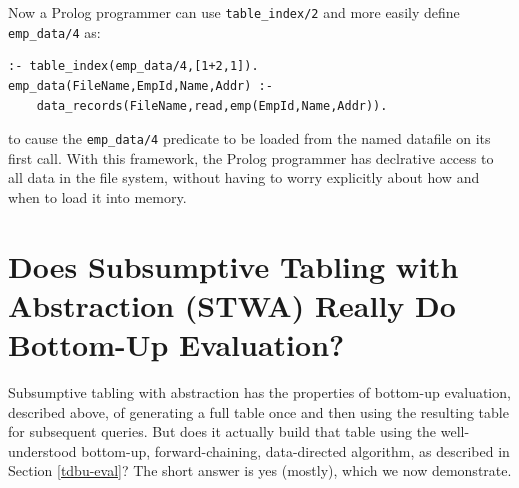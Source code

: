 Now a Prolog programmer can use {\tt table\_index/2} and more easily
define {\tt emp\_data/4} as:

\begin{verbatim}
:- table_index(emp_data/4,[1+2,1]).
emp_data(FileName,EmpId,Name,Addr) :- 
    data_records(FileName,read,emp(EmpId,Name,Addr)).
\end{verbatim}

\noindent to cause the {\tt emp\_data/4} predicate to be loaded from the
named datafile on its first call.  With this framework, the Prolog programmer has
declrative access to all data in the file system, without having to
worry explicitly about how and when to load it into memory.

\section{Does Subsumptive Tabling with Abstraction (STWA) Really Do Bottom-Up Evaluation?}

Subsumptive tabling with abstraction has the properties of bottom-up
evaluation, described above, of generating a full table once and then
using the resulting table for subsequent queries.  But does it
actually build that table using the well-understood bottom-up,
forward-chaining, data-directed algorithm, as described in Section
\ref{tdbu-eval}?  The short answer is yes (mostly), which we now
demonstrate.

